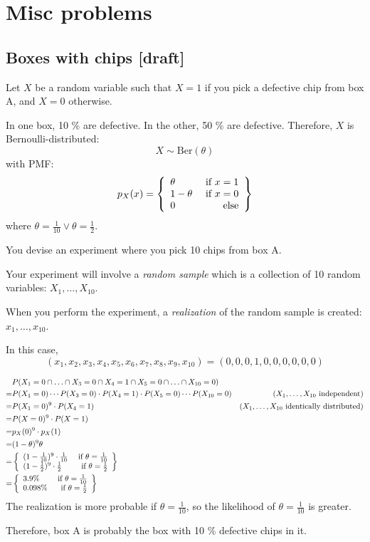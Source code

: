 \documentclass{article}
\begin{document}
\section{Misc problems}
\subsection{Boxes with chips [draft]}

Let \(X\) be a random variable such that \(X=1\) if you pick a defective chip from box A, and \(X=0\) otherwise.

In one box, 10 \% are defective. In the other, 50 \% are defective. Therefore, \(X\) is Bernoulli-distributed:
\[X \sim \text{Ber}(\theta)\]
with PMF:
\[p_X(x) = \left\{\begin{array}{lr}\theta & \text{ if }x=1\\ 1-\theta & \text{ if }x=0 \\0 & \text{ else}\end{array}\right\}\]
where \(\theta=\frac{1}{10} \vee \theta=\frac{1}{2}\).

You devise an experiment where you pick 10 chips from box A.

Your experiment will involve a \textit{random sample} which is a collection of 10 random variables: \(X_1,\ldots,X_{10}\).

When you perform the experiment, a \textit{realization} of the random sample is created: \(x_1, \ldots, x_{10}\).

In this case,
\[(x_1,x_2,x_3,x_4,x_5,x_6,x_7,x_8,x_9,x_{10})=(0,0,0,1,0,0,0,0,0,0)\]

\begin{align*}
     & P(X_1=0\cap \ldots \cap X_3=0\cap X_4=1 \cap X_5=0 \cap\ldots \cap X_{10}=0) \\
    =& P(X_1=0)\cdots P(X_3=0)\cdot P(X_4=1) \cdot P(X_5=0) \cdots P(X_{10}=0) & (X_1,\ldots,X_{10}\text{ independent}) \\
    =& P(X_1=0)^9\cdot P(X_4=1) & (X_1,\ldots,X_{10}\text{ identically distributed}) \\
    =& P(X=0)^9\cdot P(X=1) \\
    =& p_X(0)^9\cdot p_X(1) \\
    =& (1-\theta)^9\theta \\
    =& \left\{\begin{array}{lr}(1-\frac{1}{10})^9\cdot \frac{1}{10} & \text{ if }\theta=\frac{1}{10}\\(1-\frac{1}{2})^9\cdot \frac{1}{2} & \text{ if }\theta=\frac{1}{2}\end{array}\right\} \\
    =& \left\{\begin{array}{lr}3.9 \% & \text{ if }\theta=\frac{1}{10}\\0.098 \% & \text{ if }\theta=\frac{1}{2}\end{array}\right\} \\
\end{align*}
The realization is more probable if \(\theta=\frac{1}{10}\), so the likelihood of \(\theta=\frac{1}{10}\) is greater.

Therefore, box A is probably the box with 10 \% defective chips in it.
\end{document}
